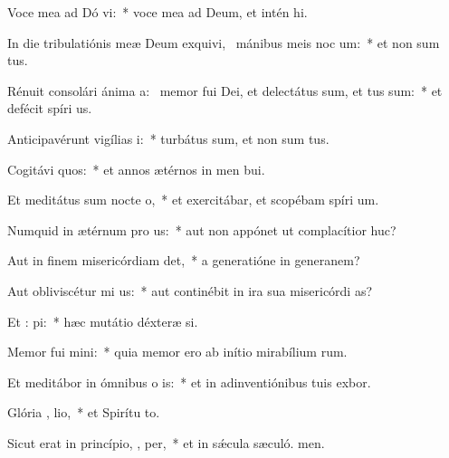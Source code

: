 \item Voce mea ad Dó vi:~* voce mea ad Deum, et intén hi.
\item In die tribulatiónis meæ Deum exquivi,~\pscross{} mánibus meis noc  um:~* et non sum tus.
\item Rénuit consolári ánima a:~\pscross{} memor fui Dei, et delectátus sum, et tus sum:~* et defécit spíri us.
\item Anticipavérunt vigílias  i:~* turbátus sum, et non sum tus.
\item Cogitávi  quos:~* et annos ætérnos in men bui.
\item Et meditátus sum nocte   o,~* et exercitábar, et scopébam spíri um.
\item Numquid in ætérnum pro us:~* aut non appónet ut complacítior  huc?
\item Aut in finem misericórdiam  det,~* a generatióne in generanem?
\item Aut obliviscétur mi us:~* aut continébit in ira sua misericórdi as?
\item Et :  pi:~* hæc mutátio déxteræ si.
\item Memor fui  mini:~* quia memor ero ab inítio mirabílium rum.
\item Et meditábor in ómnibus o is:~* et in adinventiónibus tuis exbor.
\item Glória ,  lio,~* et Spirítu to.
\item Sicut erat in princípio,  ,  per,~* et in sǽcula sæculó. men.
